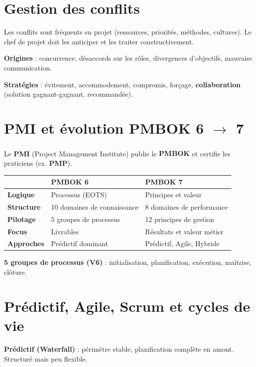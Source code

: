 \documentclass[11pt,a4paper]{article}
\begin{document}
\section{Gestion des conflits}

Les conflits sont fréquents en projet (ressources, priorités, méthodes, cultures). Le chef de projet doit les anticiper et les traiter constructivement.

\textbf{Origines} : concurrence, désaccords sur les rôles, divergences d'objectifs, mauvaise communication.

\textbf{Stratégies} : évitement, accommodement, compromis, forçage, \textbf{collaboration} (solution gagnant-gagnant, recommandée).

\section{PMI et évolution PMBOK 6 $\rightarrow$ 7}

Le \textbf{PMI} (Project Management Institute) publie le \textbf{PMBOK\textsuperscript{\textregistered}} et certifie les praticiens (ex. \textbf{PMP}).

\vspace{0.3em}
\noindent
\small
\begin{tabularx}{\textwidth}{|>{\bfseries}p{2.8cm}|X|X|}
    \hline
    \rowcolor{ifrigray}
    & \textbf{PMBOK 6} & \textbf{PMBOK 7} \\
    \hline
    Logique & Processus (EOTS) & Principes et valeur \\
    Structure & 10 domaines de connaissance & 8 domaines de performance \\
    Pilotage & 5 groupes de processus & 12 principes de gestion \\
    Focus & Livrables & Résultats et valeur métier \\
    Approches & Prédictif dominant & Prédictif, Agile, Hybride \\
    \hline
\end{tabularx}
\normalsize

\vspace{0.4em}
\textbf{5 groupes de processus (V6)} : initialisation, planification, exécution, maîtrise, clôture.

\section{Prédictif, Agile, Scrum et cycles de vie}

\textbf{Prédictif (Waterfall)} : périmètre stable, planification complète en amont. Structuré mais peu flexible.
\end{document}
